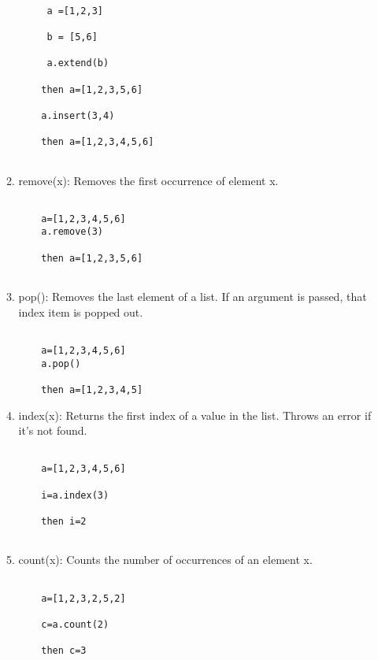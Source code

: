 \documentclass[12pt]{article}
\begin{document}
\begin{enumerate}
\begin{enumerate}
    \begin{verbatim}
          
     a =[1,2,3]
     
     b = [5,6]
     
     a.extend(b)
     
    then a=[1,2,3,5,6] 
    
    a.insert(3,4)
    
    then a=[1,2,3,4,5,6]
     
    \end{verbatim}
    
    \item  remove(x): Removes the first occurrence of element x. 
    
    \begin{verbatim}
     
    a=[1,2,3,4,5,6]
    a.remove(3)
    
    then a=[1,2,3,5,6]
   
    \end{verbatim}
    
    \item pop(): Removes the last element of a list. If an argument is passed, that index item is popped out.
    \begin{verbatim}
     
    a=[1,2,3,4,5,6]
    a.pop()
    
    then a=[1,2,3,4,5]
    \end{verbatim}
    
    \item index(x): Returns the first index of a value in the list. Throws an error if it's not found. 
    \begin{verbatim}
     
    a=[1,2,3,4,5,6]
    
    i=a.index(3)
    
    then i=2
    
    \end{verbatim}
    
    \item count(x): Counts the number of occurrences of an element x. 
    
    \begin{verbatim}
     
    a=[1,2,3,2,5,2]
    
    c=a.count(2)
    
    then c=3
    
    \end{verbatim}
    

\end{enumerate}
\end{enumerate}
\end{document}
